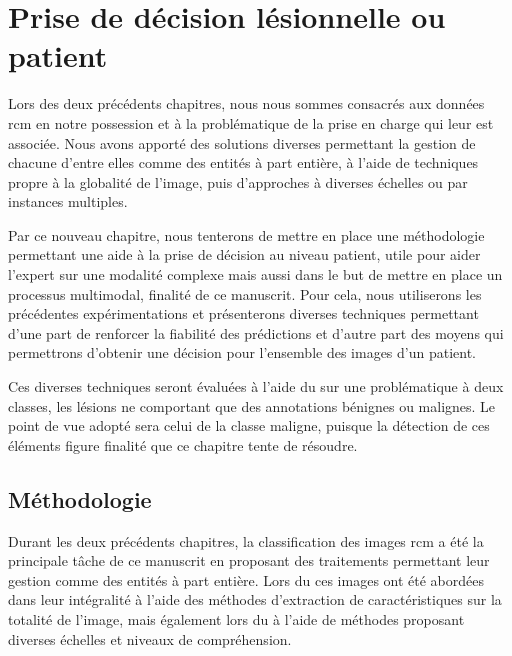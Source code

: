 \chapter{Prise de décision lésionnelle ou patient}
\label{chap:chapter_6}
\chapterintro
Lors des deux précédents chapitres, nous nous sommes consacrés aux données \gls{rcm} en notre possession et à la problématique de la prise en charge qui leur est associée. Nous avons apporté des solutions diverses permettant la gestion de chacune d'entre elles comme des entités à part entière, à l'aide de techniques propre à la globalité de l'image, puis d'approches à diverses échelles ou par instances multiples.\par

Par ce nouveau chapitre, nous tenterons de mettre en place une méthodologie permettant une aide à la prise de décision au niveau patient, utile pour aider l'expert sur une modalité complexe mais aussi dans le but de mettre en place un processus multimodal, finalité de ce manuscrit. Pour cela, nous utiliserons les précédentes expérimentations et présenterons diverses techniques permettant d'une part de renforcer la fiabilité des prédictions et d'autre part des moyens qui permettrons d'obtenir une décision pour l'ensemble des images d'un patient.\par

Ces diverses techniques seront évaluées à l'aide du \fscore{} sur une problématique à deux classes, les lésions ne comportant que des annotations bénignes ou malignes. Le point de vue adopté sera celui de la classe maligne, puisque la détection de ces éléments figure finalité que ce chapitre tente de résoudre.\par

\newpage

\section{Méthodologie}
Durant les deux précédents chapitres, la classification des images \gls{rcm} a été la principale tâche de ce manuscrit en proposant des traitements permettant leur gestion comme des entités à part entière. Lors du  ces images ont été abordées dans leur intégralité à l'aide des méthodes d'extraction de caractéristiques sur la totalité de l'image, mais également lors du  à l'aide de méthodes proposant diverses échelles et niveaux de compréhension.\par

